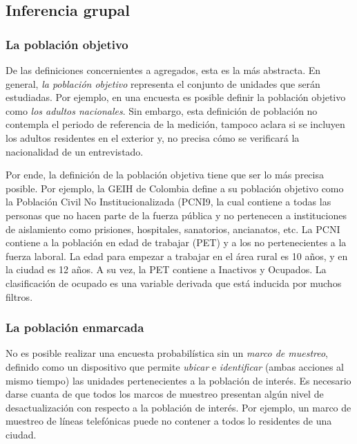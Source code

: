 \documentclass[
  10pt,
  spanish,
]{book}
\begin{document}
\hypertarget{inferencia-grupal}{%
\subsection{Inferencia grupal}\label{inferencia-grupal}}

\hypertarget{la-poblaciuxf3n-objetivo}{%
\subsubsection*{La población objetivo}\label{la-poblaciuxf3n-objetivo}}

De las definiciones concernientes a agregados, esta es la más abstracta. En general, \emph{la población objetivo} representa el conjunto de unidades que serán estudiadas. Por ejemplo, en una encuesta es posible definir la población objetivo como \emph{los adultos nacionales}. Sin embargo, esta definición de población no contempla el periodo de referencia de la medición, tampoco aclara si se incluyen los adultos residentes en el exterior y, no precisa cómo se verificará la nacionalidad de un entrevistado.

Por ende, la definición de la población objetiva tiene que ser lo más precisa posible. Por ejemplo, la GEIH de Colombia define a su población objetivo como la Población Civil No Institucionalizada (PCNI9, la cual contiene a todas las personas que no hacen parte de la fuerza pública y no pertenecen a instituciones de aislamiento como prisiones, hospitales, sanatorios, ancianatos, etc. La PCNI contiene a la población en edad de trabajar (PET) y a los no pertenecientes a la fuerza laboral. La edad para empezar a trabajar en el área rural es 10 años, y en la ciudad es 12 años. A su vez, la PET contiene a Inactivos y Ocupados. La clasificación de ocupado es una variable derivada que está inducida por muchos filtros.

\hypertarget{la-poblaciuxf3n-enmarcada}{%
\subsubsection*{La población enmarcada}\label{la-poblaciuxf3n-enmarcada}}

No es posible realizar una encuesta probabilística sin un \emph{marco de muestreo}, definido como un dispositivo que permite \emph{ubicar} e \emph{identificar} (ambas acciones al mismo tiempo) las unidades pertenecientes a la población de interés. Es necesario darse cuanta de que todos los marcos de muestreo presentan algún nivel de desactualización con respecto a la población de interés. Por ejemplo, un marco de muestreo de líneas telefónicas puede no contener a todos lo residentes de una ciudad.
\end{document}
